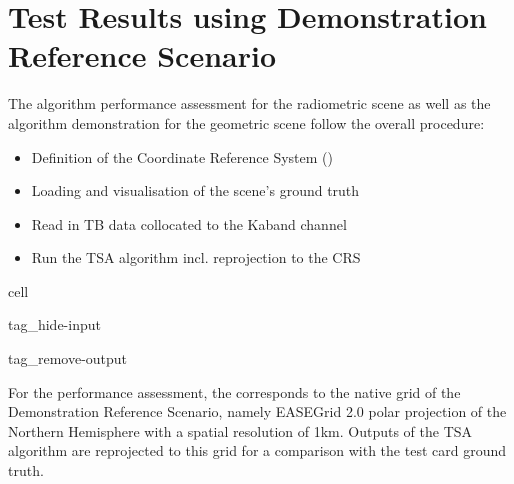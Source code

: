 \documentclass[letterpaper,10pt,english]{jupyterBook}
\begin{document}
\section{Test Results using Demonstration Reference Scenario}
\label{\detokenize{book/algorithm_performance_assessment:test-results-using-demonstration-reference-scenario}}
\sphinxAtStartPar
The algorithm performance assessment for the radiometric scene as well as the algorithm demonstration for the geometric scene follow the overall procedure:
\begin{itemize}
\item {} 
\sphinxAtStartPar
Definition of the Coordinate Reference System ({\hyperref[\detokenize{book/acronyms:term-CRS}]{}})

\item {} 
\sphinxAtStartPar
Loading and visualisation of the scene’s ground truth

\item {} 
\sphinxAtStartPar
Read in TB data collocated to the Ka\sphinxhyphen{}band channel

\item {} 
\sphinxAtStartPar
Run the TSA algorithm incl. reprojection to the CRS

\end{itemize}

\begin{sphinxuseclass}{cell}
\begin{sphinxuseclass}{tag_hide-input}
\begin{sphinxuseclass}{tag_remove-output}
\end{sphinxuseclass}
\end{sphinxuseclass}
\end{sphinxuseclass}
\sphinxAtStartPar
For the performance assessment, the {\hyperref[\detokenize{book/acronyms:term-CRS}]{}} corresponds to the native grid of the Demonstration Reference Scenario, namely EASE\sphinxhyphen{}Grid 2.0 polar projection of the Northern Hemisphere with a spatial resolution of 1km.
Outputs of the TSA algorithm are reprojected to this grid for a comparison with the test card ground truth.
\end{document}
